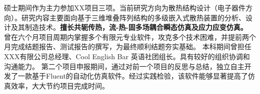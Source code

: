 \documentclass[a4paper,11pt]{ctexart}
\begin{document}
  \resumeItemListStart
    {硕士期间作为主力参加XX项目三项。当前研究方向为散热结构设计（电子器件方向）。研究内容主要面向基于三维堆叠阵列结构的多级嵌入式散热装置的分析、设计及其制造技术。\textbf{擅长共轭传热，流-热-固多场耦合瞬态仿真及应力应变仿真。}}
    {曾在六个月项目周期内掌握多个有限元专业软件，攻克多个技术困难，并提前两个月完成结题报告、测试报告的撰写，为最终顺利结题夯实基础。}
    {本科期间曾担任XXX有限公司总经理、Cool English Bar 英语社团组长。具有较好的组织协调和沟通能力。}
    {第二个项目申报期间，通过对前一个项目的反思与总结，独立自主开发了一款基于Fluent的自动化仿真软件。经过实践检验，该软件能够显著提高了仿真效率，大大节约项目完成时间。}
  \resumeItemListEnd
\vspace{-4mm}


\vfill
{}
\end{document}
